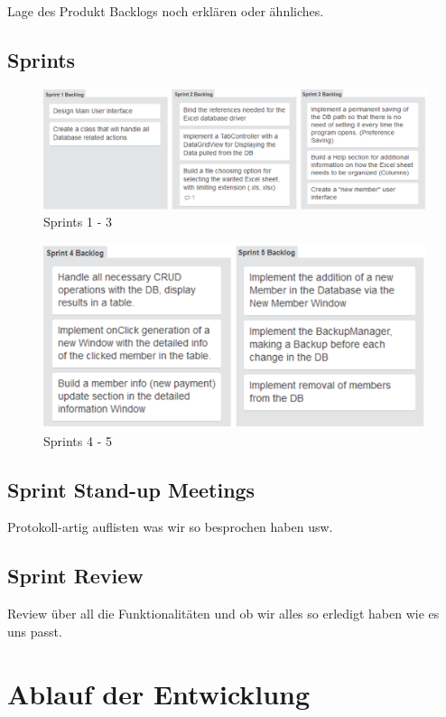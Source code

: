 \documentclass{article}
\begin{document}
Lage des Produkt Backlogs noch erklären oder ähnliches.

\subsection{Sprints}
\begin{figure}[h]
	\centering 
	\includegraphics[width=0.6\paperwidth]{Sprint1-3}
	\caption{Sprints 1 - 3}
\end{figure}

\begin{figure}[h]
	\centering
	\includegraphics[width=0.4\paperwidth]{Sprint4-5}
	\caption{Sprints 4 - 5}
\end{figure}

\subsection{Sprint Stand-up Meetings}
Protokoll-artig auflisten was wir so besprochen haben usw.

\subsection{Sprint Review}
Review über all die Funktionalitäten und ob wir alles so erledigt haben wie es uns passt.

\newpage

\section{Ablauf der Entwicklung}
\end{document}
